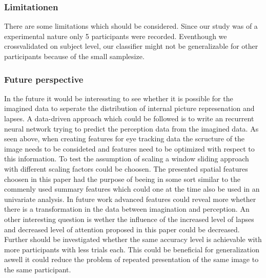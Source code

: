 \documentclass[a4paper,man,natbib,floatsintext]{apa6}
\begin{document}
\subsubsection{Limitationen}
There are some limitations which should be considered. Since our study was of a experimental nature only 5 participants were recorded. Eventhough we crossvalidated on subject level, our classifier might not be generalizable for other participants because of the small samplesize.

\subsubsection{Future perspective}
In the future it would be interessting to see whether it is possible for the imagined data to seperate the distribution of internal picture represenation and lapses. A data-driven approach which could be followed is to write an recurrent neural network trying to predict the perception data from the imagined data. As seen above, when creating features for eye tracking data the scructure of the image needs to be consideted and features need to be optimized with respect to this information. To test the assumption of scaling a window sliding approach with different scaling factors could be choosen. 
The presented spatial features choosen in this paper had the purpose of beeing in some sort similar to the commenly used summary features which could one at the time also be used in an univariate analysis. In future work advanced features could reveal more whether there is a transformation in the data between imagination and perception. An other interesting question is wether the influence of the increased level of lapses and decreased level of attention proposed in this paper could be decreased.
Further should be investigated whether the same accuracy level is achievable with more participants with less trials each. This could be beneficial for generalization aswell it could reduce the problem of repeated presentation of the same image to the same participant.

\citep{Bauer2014}

 

\newpage
\end{document}
